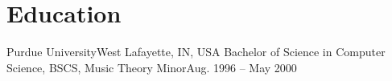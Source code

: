 \section{Education}
  \resumeSubHeadingListStart
    \resumeSubheading
      {Purdue University}{West Lafayette, IN, USA}
      {Bachelor of Science in Computer Science, BSCS, Music Theory Minor}{Aug. 1996 -- May 2000}
  \resumeSubHeadingListEnd
